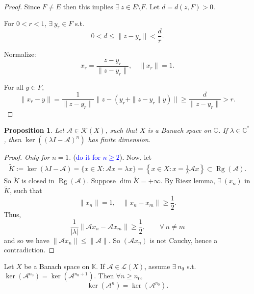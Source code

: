 \documentclass[12pt, oneside]{book}
\newtheorem{prop}{Proposition}[section]
\begin{document}
\begin{proof}
Since	$F\neq E$ then this implies $ \exists\ z\in E\setminus F$. Let $d=d(z,F)>0$.
	
	For $0<r<1$, $\exists\ y_r\in F$ s.t.
	\[
	0<d\le \|z-y_r\|<\frac dr.
	\]
	
	Normalize:
	\[
	x_r=\frac{z-y_r}{\|z-y_r\|},\quad \|x_r\|=1.
	\]
	
	For all $y\in F$,
	\vspace{-3mm}
	\[
	\|x_r-y\|
	=\frac{1}{\|z-y_r\|}\|z-(y_r+\|z-y_r\|y)\|
	\ge\frac d{\|z-y_r\|}>r.
	\]
\end{proof}		
\begin{prop}
Let	$\mathscr{A}\in\mathcal{K}(X)$, such that $X$ is a Banach space on $\mathbb{C}$.
If $\lambda\in\mathbb{C}^*$, then
	$
	\ker((\lambda I-\mathscr{A})^n)
	$
	has finite dimension.	
\end{prop}		
\begin{proof}[Proof. Only for $n=1$] (\textcolor{blue}{do it for $n\geq 2$}). Now, let
\vspace{-4mm}
\begin{align*}
\tilde K:=\ker(\lambda I-\mathscr{A})
=\{x\in X:\mathscr{A}x=\lambda x\}
=\left\{x\in X:x=\frac1\lambda \mathscr{A}x\right\}\subset \operatorname{Rg}(\mathscr{A}).
\end{align*}
So $\tilde K$ is closed in $\operatorname{Rg}(\mathscr{A})$.
Suppose $\dim\tilde K=+\infty$.
By Riesz lemma, $\exists\  (x_n)$ in $\tilde K$, such that
\[
\|x_n\|=1,\quad \|x_n-x_m\|\ge\frac12.
\]
Thus,
\[
\frac1{|\lambda|}\|\mathscr{A}x_n-\mathscr{A}x_m\|\ge\frac12, \qquad \forall \ n\neq m
\]
and so we have $\|\mathscr{A}x_n\|\leq \|\mathscr{A}\|$.
So $(\mathscr{A}x_n)$ is not Cauchy, hence a contradiction.

\end{proof}		
		
\begin{exercise}{}{}
	Let $X$ be a Banach space on $\mathbb{K}$. If $\mathscr{A}\in\mathcal{L}(X)$,
 assume $\exists\  n_0$ s.t.
$
\ker(\mathscr{A}^{n_0})=\ker(\mathscr{A}^{n_0+1}).
$
Then $\forall n\ge n_0$,
\[
\ker(\mathscr{A}^n)=\ker(\mathscr{A}^{n_0}).
\]
\end{exercise}		
\end{document}
